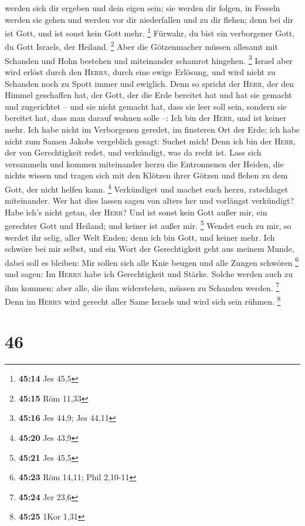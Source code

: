 werden sich dir ergeben und dein eigen sein; sie werden dir folgen, in
Fesseln werden sie gehen und werden vor dir niederfallen und zu dir
flehen; denn bei dir ist Gott, und ist sonst kein Gott mehr. \footnote{\textbf{45:14}
  Jes 45,5}  Fürwahr, du bist ein verborgener Gott, du
Gott Israels, der Heiland. \footnote{\textbf{45:15} Röm 11,33}
 Aber die Götzenmacher müssen allesamt mit Schanden und
Hohn bestehen und miteinander schamrot hingehen. \footnote{\textbf{45:16}
  Jes 44,9; Jes 44,11}  Israel aber wird erlöst durch den
\textsc{Herrn}, durch eine ewige Erlösung, und wird nicht zu Schanden
noch zu Spott immer und ewiglich.  Denn so spricht der
\textsc{Herr}, der den Himmel geschaffen hat, der Gott, der die Erde
bereitet hat und hat sie gemacht und zugerichtet -- und sie nicht
gemacht hat, dass sie leer soll sein, sondern sie bereitet hat, dass man
darauf wohnen solle --: Ich bin der \textsc{Herr}, und ist keiner mehr.
 Ich habe nicht im Verborgenen geredet, im finsteren Ort
der Erde; ich habe nicht zum Samen Jakobs vergeblich gesagt: Suchet
mich! Denn ich bin der \textsc{Herr}, der von Gerechtigkeit redet, und
verkündigt, was da recht ist.  Lass sich versammeln und
kommen miteinander herzu die Entronnenen der Heiden, die nichts wissen
und tragen sich mit den Klötzen ihrer Götzen und flehen zu dem Gott, der
nicht helfen kann. \footnote{\textbf{45:20} Jes 43,9} 
Verkündiget und machet euch herzu, ratschlaget miteinander. Wer hat dies
lassen sagen von alters her und vorlängst verkündigt? Habe ich's nicht
getan, der \textsc{Herr}? Und ist sonst kein Gott außer mir, ein
gerechter Gott und Heiland; und keiner ist außer mir. \footnote{\textbf{45:21}
  Jes 45,5}  Wendet euch zu mir, so werdet ihr selig,
aller Welt Enden; denn ich bin Gott, und keiner mehr. 
Ich schwöre bei mir selbst, und ein Wort der Gerechtigkeit geht aus
meinem Munde, dabei soll es bleiben: Mir sollen sich alle Knie beugen
und alle Zungen schwören \footnote{\textbf{45:23} Röm 14,11; Phil
  2,10-11}  und sagen: Im \textsc{Herrn} habe ich
Gerechtigkeit und Stärke. Solche werden auch zu ihm kommen; aber alle,
die ihm widerstehen, müssen zu Schanden werden. \footnote{\textbf{45:24}
  Jer 23,6}  Denn im \textsc{Herrn} wird gerecht aller
Same Israels und wird sich sein rühmen. \footnote{\textbf{45:25} 1Kor
  1,31}

\hypertarget{section-16}{%
\section{46}\label{section-16}}

